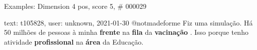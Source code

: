 \begin{frame}{Examples: Dimension 4 pos, score 5, \# 000029}
\footnotesize
\begin{exampleblock}{text: t105828, user: unknown, 2021-01-30}
@notmadeforme Fiz uma simulação. Há 50 milhões de pessoas à minha 
\textbf{frente} na \textbf{fila} da \textbf{vacinação} . Isso porque tenho 
atividade \textbf{profissional} na \textbf{área} da Educação. 
\end{exampleblock}
\end{frame}
